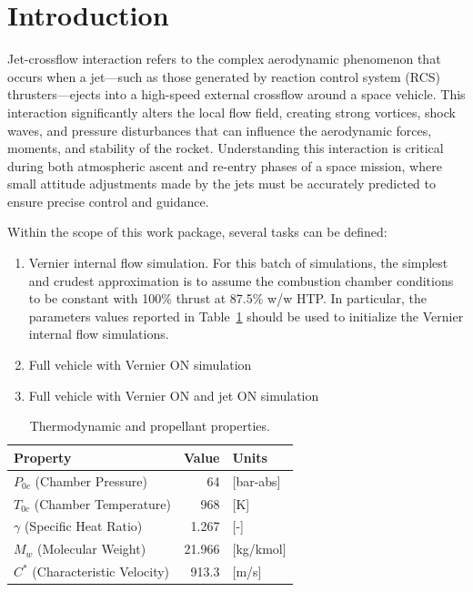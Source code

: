 \documentclass[12pt]{article}
\begin{document}
%

\tableofcontents

\section{Introduction}\label{sec:introduction}
Jet-crossflow interaction refers to the complex aerodynamic phenomenon that occurs when a jet—such as those generated by reaction control system (RCS) thrusters—ejects into a high-speed external crossflow around a space vehicle. This interaction significantly alters the local flow field, creating strong vortices, shock waves, and pressure disturbances that can influence the aerodynamic forces, moments, and stability of the rocket. Understanding this interaction is critical during both atmospheric ascent and re-entry phases of a space mission, where small attitude adjustments made by the jets must be accurately predicted to ensure precise control and guidance. 

Within the scope of this work package, several tasks can be defined:

\begin{enumerate}
    \item Vernier internal flow simulation. For this batch of simulations, the simplest and crudest approximation is to assume the combustion chamber conditions to be constant with 100\% thrust at 87.5\% w/w HTP. In particular, the parameters values reported in Table~\ref{tab:vernier_inlet} should be used to initialize the Vernier internal flow simulations.
    \item Full vehicle with Vernier ON simulation
    \item Full vehicle with Vernier ON and jet ON simulation
\end{enumerate}

\begin{table}[H]
    \centering
    \caption{Thermodynamic and propellant properties.}
    \label{tab:vernier_inlet}
    \begin{tabular}{l r l}
        \toprule
        Property & Value & Units \\
        \midrule
        $P_{0c}$ (Chamber Pressure) & 64 & [bar-abs] \\
        $T_{0c}$ (Chamber Temperature) & 968 & [K] \\
        $\gamma$ (Specific Heat Ratio) & 1.267 & [-] \\
        $M_w$ (Molecular Weight) & 21.966 & [kg/kmol] \\
        $C^*$ (Characteristic Velocity) & 913.3 & [m/s] \\
        \bottomrule
    \end{tabular}
\end{table}
\end{document}
